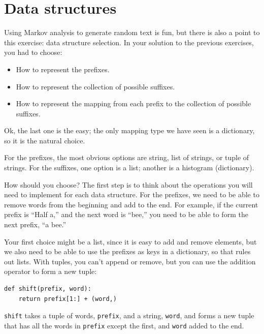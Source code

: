 \documentclass[10pt]{book}
\begin{document}
\section{Data structures}


Using Markov analysis to generate random text is fun, but there is
also a point to this exercise: data structure selection.  In your
solution to the previous exercises, you had to choose:

\begin{itemize}

\item How to represent the prefixes.

\item How to represent the collection of possible suffixes.

\item How to represent the mapping from each prefix to
the collection of possible suffixes.

\end{itemize}

Ok, the last one is the easy; the only mapping type we have
seen is a dictionary, so it is the natural choice.

For the prefixes, the most obvious options are string,
list of strings, or tuple of strings.  For the suffixes,
one option is a list; another is a histogram (dictionary).


How should you choose?  The first step is to think about
the operations you will need to implement for each data structure.
For the prefixes, we need to be able to remove words from
the beginning and add to the end.  For example, if the current
prefix is ``Half a,'' and the next word is ``bee,'' you need
to be able to form the next prefix, ``a bee.''


Your first choice might be a list, since it is easy to add
and remove elements, but we also need to be able to use the
prefixes as keys in a dictionary, so that rules out lists.
With tuples, you can't append or remove, but you can use
the addition operator to form a new tuple:

\beforeverb
\begin{verbatim}
def shift(prefix, word):
    return prefix[1:] + (word,)
\end{verbatim}
\afterverb
%
{\tt shift} takes a tuple of words, {\tt prefix}, and a string, 
{\tt word}, and forms a new tuple that has all the words
in {\tt prefix} except the first, and {\tt word} added to
the end.
\end{document}
